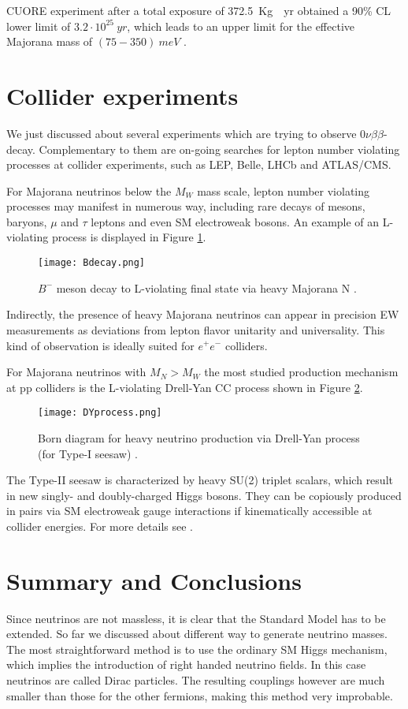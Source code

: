 \documentclass{subnucbo}
\begin{document}
CUORE experiment after a total exposure of \SI{372.5}{Kg\cdot yr} obtained a 90\% CL lower limit of $3.2\cdot10^{25}\SI{}{yr}$, which leads to an upper limit for the effective Majorana mass of $(75-350)\SI{}{meV}$ \cite{ref:cuore}.

\section{Collider experiments}
We just discussed about several experiments which are trying to observe $0\nu\beta\beta$-decay. Complementary to them are on-going searches for lepton number violating processes at collider experiments, such as LEP, Belle, LHCb and ATLAS/CMS.

For Majorana neutrinos below the $M_W$ mass scale, lepton number violating processes may manifest in numerous way, including rare decays of mesons, baryons, $\mu$ and $\tau$ leptons and even SM electroweak bosons. An example of an L-violating process is displayed in Figure \ref{fig:Lviol}.
\begin{figure}
\centering
\texttt{[image: Bdecay.png]}
\caption{$B^-$ meson decay to L-violating final state via heavy Majorana N \cite{ref:front}.}
\label{fig:Lviol}
\end{figure}
Indirectly, the presence of heavy Majorana neutrinos can appear in precision EW measurements as deviations from lepton flavor unitarity and universality. This kind of observation is ideally suited for $e^+e^-$ colliders.

For Majorana neutrinos with $M_N>M_W$ the most studied production mechanism at pp colliders is the L-violating Drell-Yan CC process shown in Figure \ref{fig:DY}.
\begin{figure}
\centering
\texttt{[image: DYprocess.png]}
\caption{Born diagram for heavy neutrino production via Drell-Yan process (for Type-I seesaw)  \cite{ref:front}.}
\label{fig:DY}
\end{figure}
The Type-II seesaw is characterized by heavy SU(2) triplet scalars, which result in new singly- and doubly-charged Higgs bosons. They can be copiously produced in pairs via SM electroweak gauge interactions if kinematically accessible at collider energies.
For more details see \cite{ref:front}. 

\section{Summary and Conclusions}
Since neutrinos are not massless, it is clear that the Standard Model has to be extended. So far we discussed about different way to generate neutrino masses. The most straightforward method is to use the ordinary SM Higgs mechanism, which implies the introduction of right handed neutrino fields. In this case neutrinos are called Dirac particles. The resulting couplings however are much smaller than those for the other fermions, making this method very improbable.
\end{document}
